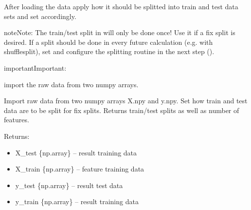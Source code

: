 \documentclass[letterpaper,10pt,english]{sphinxmanual}
\begin{document}
After loading the data apply how it should be splitted into train and test data sets and set  accordingly.

\begin{sphinxadmonition}{note}{Note:}
The train/test split in  will only be done once!
Use it if a fix split is desired.
If a split should be done in every future calculation (e.g. with shufflesplit),
set  and configure the splitting routine
in the next step ({\hyperref[\detokenize{Generate_Database:compute}]{}}).
\end{sphinxadmonition}

\begin{sphinxadmonition}{important}{Important:}

\begin{fulllineitems}
\label{\detokenize{Importing_Data:ForestFire.import_data.import_data}}
import the raw data from two numpy arrays.

Import raw data from two numpy arrays X.npy and y.npy. 
Set how train and test data are to be split for fix splits.
Returns train/test splits as well as number of features.

Returns:
\begin{itemize}
\item {} 
X\_test \{np.array\} -- result training data

\item {} 
X\_train \{np.array\} -- feature training data

\item {} 
y\_test \{np.array\} -- result test data

\item {} 
y\_train \{np.array\} -- result training data

\end{itemize}

\end{fulllineitems}

\end{sphinxadmonition}
\label{\detokenize{Importing_Data:blank}}\begin{figure}[htbp]
\centering

\noindent{}
\label{\detokenize{Importing_Data:blank}}\end{figure}
\end{document}
